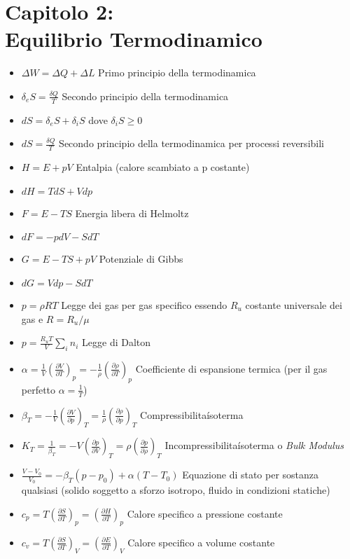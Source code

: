 \documentclass[a4paper]{article}
\begin{document}
\section{Capitolo 2:\\ Equilibrio Termodinamico}
\begin{itemize}
	\item $\Delta W = \Delta Q + \Delta L$ Primo principio della termodinamica
	\item $\delta_e S = \frac{\delta Q}{T}$ Secondo principio della termodinamica
	\item $dS = \delta_e S + \delta_i S$ dove $\delta_i S \geq 0 $
	\item $ dS = \frac{\delta Q}{T}$ Secondo principio della termodinamica per processi reversibili
	\item $H=E+pV$ Entalpia (calore scambiato a p costante)
	\item $dH=TdS+Vdp$
	\item $F=E-TS$ Energia libera di Helmoltz
	\item $dF=-pdV-SdT$
	\item $G=E-TS+pV$ Potenziale di Gibbs
	\item $dG=Vdp-SdT$
	\item $p=\rho R T$ Legge dei gas per gas specifico essendo $R_u$ costante universale dei gas e $R= R_u / \mu$
	\item $p = \frac{R_u T}{V}\sum_{i}^{}n_i$ Legge di Dalton
	\item $\alpha = \frac{1}{V}(\frac{\partial V}{\partial T})_p = -\frac{1}{\rho}(\frac{\partial \rho}{\partial T})_p$ Coefficiente di espansione termica (per il gas perfetto $\alpha = \frac{1}{T}$)
	\item $\beta_T=-\frac{1}{V}(\frac{\partial V}{\partial p})_T=\frac{1}{\rho}(\frac{\partial \rho}{\partial p})_T $ Compressibilita\' isoterma
	\item $K_T=\frac{1}{\beta_T}=-V(\frac{\partial p}{\partial V})_T=\rho (\frac{\partial p}{\partial \rho})_T$ Incompressibilita\' isoterma o \textit{Bulk Modulus}
	\item $ \frac{V-V_0}{V_0} = -\beta_T (p-p_0)+\alpha(T-T_0) $ Equazione di stato per sostanza qualsiasi (solido soggetto a sforzo isotropo, fluido in condizioni statiche)
	\item $c_p=T(\frac{\partial S}{\partial T})_p = (\frac{\partial H}{\partial T})_p$ Calore specifico a pressione costante
	\item $c_v=T(\frac{\partial S}{\partial T})_V = (\frac{\partial E}{\partial T})_V$ Calore specifico a volume costante

\end{itemize}
\end{document}
